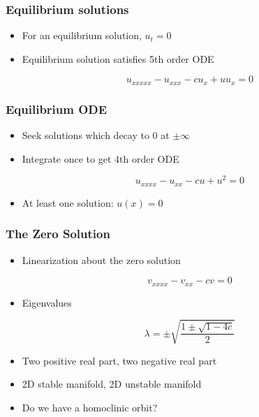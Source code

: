 \documentclass[16pt]{beamer}
\begin{document}
\begin{frame}
	\frametitle{Equilibrium solutions}
	\fontsize{18}{7.2}\selectfont
	\begin{itemize}
		\item<1-> For an equilibrium solution, $u_t = 0$

		\vspace{0.5cm}
		\item<2-> Equilibrium solution satisfies 5th order ODE 
		\begin{center}
		\[ u_{xxxxx} - u_{xxx} - c u_x + u u_x = 0 \]
		\end{center}
	\end{itemize}
\end{frame}

\begin{frame}
	\frametitle{Equilibrium ODE}
	\fontsize{18}{7.2}\selectfont
	\begin{itemize}
		\item<1->Seek solutions which decay to 0 at $\pm \infty$
		\vspace{0.5cm}
		\item<2->Integrate once to get 4th order ODE 
		\begin{center}
		\[u_{xxxx} - u_{xx} - cu + u^2 = 0\]
		\end{center}
		\vspace{0.5cm}
		\item<3->At least one solution: $u(x) = 0$
	\end{itemize} 
\end{frame}

\begin{frame}
	\frametitle{The Zero Solution}
	\fontsize{16}{7.2}\selectfont
	\begin{itemize}
		\item<1->Linearization about the zero solution
		\begin{center}
		\[v_{xxxx} - v_{xx} - c v = 0 \]
		\end{center}
		\item<2->Eigenvalues
		\begin{center}
		\[ \lambda = \pm \sqrt{ \frac{1 \pm \sqrt{1 - 4c } }{ 2} } \]
		\end{center}
		\item<3->Two positive real part, two negative real part
		\item<4->2D stable manifold, 2D unstable manifold
		\item<5->Do we have a homoclinic orbit?
	\end{itemize}
\end{frame}
\end{document}

